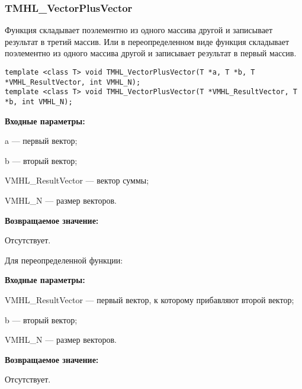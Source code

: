 \documentclass[a4paper,12pt]{article}
\begin{document}
\subsubsection{TMHL\_VectorPlusVector}\label{TMHL_VectorPlusVector}

Функция складывает поэлементно из одного массива другой и записывает результат в третий массив. Или в переопределенном виде функция складывает поэлементно из одного массива другой и записывает результат в первый массив.


\begin{lstlisting}[label=code_syntax_TMHL_VectorPlusVector,caption=Синтаксис]
template <class T> void TMHL_VectorPlusVector(T *a, T *b, T *VMHL_ResultVector, int VMHL_N);
template <class T> void TMHL_VectorPlusVector(T *VMHL_ResultVector, T *b, int VMHL_N);
\end{lstlisting}

\textbf{Входные параметры:}

  a --- первый вектор;
  
 b --- вторый вектор;
 
 VMHL\_ResultVector --- вектор суммы;
 
 VMHL\_N --- размер векторов.

\textbf{Возвращаемое значение:}

Отсутствует.

Для переопределенной функции:

\textbf{Входные параметры:}

 VMHL\_ResultVector --- первый вектор, к которому прибавляют второй вектор;
  
 b --- вторый вектор;
 
 VMHL\_N --- размер векторов.

\textbf{Возвращаемое значение:}

Отсутствует.
\end{document}
